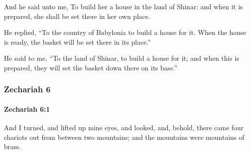 			\begin{versebox}
					\item[BHS] 
					\item[LXX] 
					\item[ASV] And he said unto me, To build her a house in the land of Shinar: and when it is prepared, she shall be set there in her own place.
					\item[NIV] He replied, “To the country of Babylonia to build a house for it. When the house is ready, the basket will be set there in its place.”
					\item[NRSV] He said to me, “To the land of Shinar, to build a house for it; and when this is prepared, they will set the basket down there on its base.”
			\end{versebox}
	\subsubsection{Zechariah 6} %
		\label{ZECHARIAH-6}

		\paragraph{Zechariah 6:1} %
			\label{ZECHARIAH-6-1}

			And I turned, and lifted up mine eyes, and looked, and, behold, there came four chariots out from between two mountains; and the mountains were mountains of brass.

